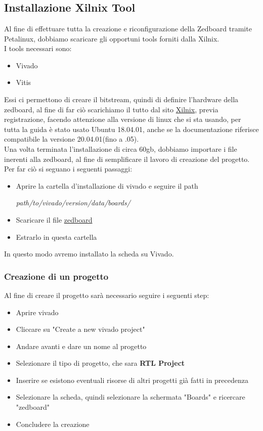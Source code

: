 \chapter{}

\section{Installazione Xilnix Tool}
\label{app:a}
Al fine di effettuare tutta la creazione e riconfigurazione della Zedboard tramite Petalinux, dobbiamo scaricare gli opportuni tools forniti dalla Xilnix.\\
I tools necessari sono:
\begin{itemize}
\item Vivado
\item Vitis
\end{itemize}
Essi ci permettono di creare il bitstream, quindi di definire l'hardware della zedboard, al fine di far ciò scarichiamo il tutto dal sito \href{https://www.xilinx.com/support/download/index.html/content/xilinx/en/downloadNav/vivado-design-tools.html}{Xilnix}, previa registrazione, facendo attenzione alla versione di linux che si sta usando, per tutta la guida è stato usato Ubuntu 18.04.01, anche se la documentazione riferisce compatibile la versione 20.04.01(fino a .05).\\
Una volta terminata l'installazione di circa 60gb, dobbiamo importare i file inerenti alla zedboard, al fine di semplificare il lavoro di creazione del progetto. Per far ciò si seguano i seguenti passaggi:
\begin{itemize}
\item Aprire la cartella d'installazione di vivado e seguire il path
\begin{center}
\textit{path/to/vivado/version/data/boards/}
\end{center}
\item Scaricare il file \href{https://github.com/Digilent/vivado-boards/archive/master.zip}{zedboard}
\item Estrarlo in questa cartella
\end{itemize}
In questo modo avremo installato la scheda su Vivado.
\subsection{Creazione di un progetto}
\label{CreazioneVivado}
Al fine di creare il progetto sarà necessario seguire i seguenti step:
\begin{itemize}
\item Aprire vivado
\item Cliccare su "Create a new vivado project"
\item Andare avanti e dare un nome al progetto
\item Selezionare il tipo di progetto, che sara \textbf{RTL Project}
\item Inserire se esistono eventuali risorse di altri progetti già fatti in precedenza
\item Selezionare la scheda, quindi selezionare la schermata "Boards" e ricercare "zedboard"
\item Concludere la creazione
\end{itemize}
